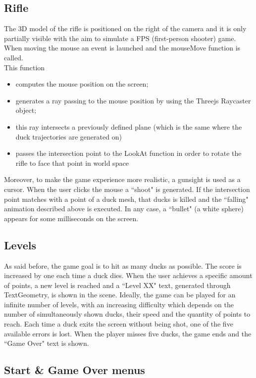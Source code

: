 \documentclass[12pt,a4paper]{article}
\begin{document}
	\subsection{Rifle}
	The 3D model of the rifle is positioned on the right of the camera and it is only partially visible with the aim to simulate a FPS (first-person shooter) game.
	When moving the mouse an event is launched and the mouseMove function is called.\\
	This function
	\begin{itemize}
		\item computes the mouse position on the screen;
		\item generates a ray passing to the mouse position by using the Threejs Raycaster object;
		\item this ray intersects a previously defined plane (which is the same where the duck trajectories are generated on)
		\item passes the intersection point to the LookAt function in order to rotate the rifle to face that point in world space
	\end{itemize}
	Moreover, to make the game experience more realistic, a gunsight is used as a cursor. 
	When the user clicks the mouse a ``shoot" is generated. If the intersection point matches with a point of a duck mesh, that ducks is killed and the ``falling" animation described above is executed. In any case, a ``bullet" (a white sphere) appears for some milliseconds on the screen.
	
	\subsection{Levels}
	As said before, the game goal is to hit as many ducks as possible. The score is increased by one each time a duck dies. When the user achieves a specific amount of points, a new level is reached and a ``Level XX" text, generated through TextGeometry, is shown in the scene.
	Ideally, the game can be played for an infinite number of levels, with an increasing difficulty which depends on the number of simultaneously shown ducks, their speed and the quantity of points to reach.
	Each time a duck exits the screen without being shot, one of the five available errors is lost. When the player misses five ducks, the game ends and the ``Game Over" text is shown.
	
	\subsection{Start \& Game Over menus}
	
\end{document}
